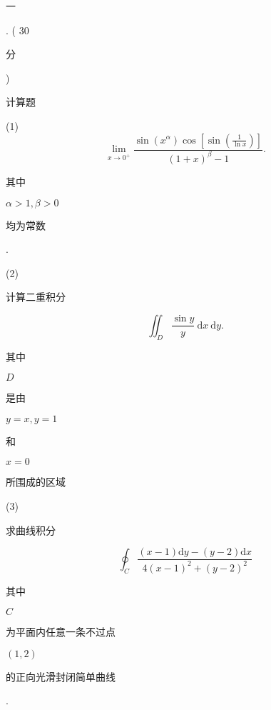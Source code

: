 \documentclass[10pt]{article}
\begin{document}
\begin{CJK}{UTF8}{mj}一\end{CJK}. ( 30 \begin{CJK}{UTF8}{mj}分\end{CJK}) \begin{CJK}{UTF8}{mj}计算题\end{CJK}

(1)
$$
\lim _{x \rightarrow 0^{+}} \frac{\sin \left(x^{\alpha}\right) \cos \left[\sin \left(\frac{1}{\ln x}\right)\right]}{(1+x)^{\beta}-1} .
$$
\begin{CJK}{UTF8}{mj}其中\end{CJK} $\alpha>1, \beta>0$ \begin{CJK}{UTF8}{mj}均为常数\end{CJK}.

(2) \begin{CJK}{UTF8}{mj}计算二重积分\end{CJK}
$$
\iint_{D} \frac{\sin y}{y} \mathrm{~d} x \mathrm{~d} y .
$$
\begin{CJK}{UTF8}{mj}其中\end{CJK} $D$ \begin{CJK}{UTF8}{mj}是由\end{CJK} $y=x, y=1$ \begin{CJK}{UTF8}{mj}和\end{CJK} $x=0$ \begin{CJK}{UTF8}{mj}所围成的区域\end{CJK}

(3) \begin{CJK}{UTF8}{mj}求曲线积分\end{CJK}
$$
\oint_{C} \frac{(x-1) \mathrm{d} y-(y-2) \mathrm{d} x}{4(x-1)^{2}+(y-2)^{2}}
$$
\begin{CJK}{UTF8}{mj}其中\end{CJK} $C$ \begin{CJK}{UTF8}{mj}为平面内任意一条不过点\end{CJK} $(1,2)$ \begin{CJK}{UTF8}{mj}的正向光滑封闭简单曲线\end{CJK}.
\end{document}
